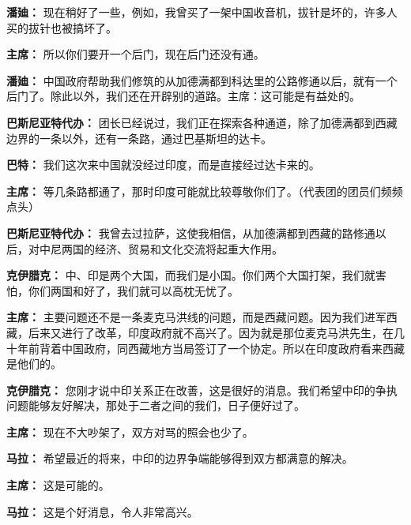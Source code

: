 \begin{duihua}
\item[\textbf{潘廸：}] 现在稍好了一些，例如，我曾买了一架中国收音机，拔针是坏的，许多人买的拔针也被搞坏了。

\item[\textbf{主席：}] 所以你们要开一个后门，现在后门还没有通。

\item[\textbf{潘廸：}] 中国政府帮助我们修筑的从加德满都到科达里的公路修通以后，就有一个后门了。除此以外，我们还在开辟别的道路。主席：这可能是有益处的。

\item[\textbf{巴斯尼亚特代办：}] 团长已经说过，我们正在探索各种通道，除了加德满都到西藏边界的一条以外，还有一条路，通过巴基斯坦的达卡。

\item[\textbf{巴特：}] 我们这次来中国就没经过印度，而是直接经过达卡来的。

\item[\textbf{主席：}] 等几条路都通了，那时印度可能就比较尊敬你们了。（代表团的团员们频频点头）

\item[\textbf{巴斯尼亚特代办：}] 我曾去过拉萨，这使我相信，从加德满都到西藏的路修通以后，对中尼两国的经济、贸易和文化交流将起重大作用。

\item[\textbf{克伊腊克：}] 中、印是两个大国，而我们是小国。你们两个大国打架，我们就害怕，你们两国和好了，我们就可以高枕无忧了。

\item[\textbf{主席：}] 主要问题还不是一条麦克马洪线的问题，而是西藏问题。因为我们进军西藏，后来又进行了改革，印度政府就不高兴了。因为就是那位麦克马洪先生，在几十年前背着中国政府，同西藏地方当局签订了一个协定。所以在印度政府看来西藏是他们的。

\item[\textbf{克伊腊克：}] 您刚才说中印关系正在改善，这是很好的消息。我们希望中印的争执问题能够友好解决，那处于二者之间的我们，日子便好过了。

\item[\textbf{主席：}] 现在不大吵架了，双方对骂的照会也少了。

\item[\textbf{马拉：}] 希望最近的将来，中印的边界争端能够得到双方都满意的解决。

\item[\textbf{主席：}] 这是可能的。

\item[\textbf{马拉：}] 这是个好消息，令人非常高兴。


\end{duihua}
